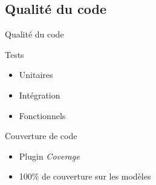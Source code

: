 \FlorentSpeak
\subsection{Qualit\'e du code}
\begin{frame}{Qualité du code}
	\pause
	\begin{block}{Tests}
		\begin{itemize}
			\item Unitaires
			\item Intégration
			\item Fonctionnels %
		\end{itemize}
	\end{block}	
	\vfill
	\pause
	\begin{block}{Couverture de code}
		\begin{itemize}
			\item Plugin \textit{Coverage}
			\item 100\% de couverture sur les modèles  \cmark
		\end{itemize}
	\end{block}	
\end{frame}
